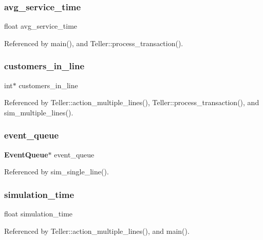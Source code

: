 \subsubsection{avg\+\_\+service\+\_\+time}
{\footnotesize\ttfamily float avg\+\_\+service\+\_\+time}



Referenced by main(), and Teller\+::process\+\_\+transaction().

\mbox{\label{teller_8cpp_abf7392d380d62115dbe6c7c4d74dab62}} 
\subsubsection{customers\+\_\+in\+\_\+line}
{\footnotesize\ttfamily int$\ast$ customers\+\_\+in\+\_\+line}



Referenced by Teller\+::action\+\_\+multiple\+\_\+lines(), Teller\+::process\+\_\+transaction(), and sim\+\_\+multiple\+\_\+lines().

\mbox{\label{teller_8cpp_aa744d577d29be27806283672a6ef5502}} 
\subsubsection{event\+\_\+queue}
{\footnotesize\ttfamily \textbf{ Event\+Queue}$\ast$ event\+\_\+queue}



Referenced by sim\+\_\+single\+\_\+line().

\mbox{\label{teller_8cpp_a68868698f39e24d72046de64a0adbc70}} 
\subsubsection{simulation\+\_\+time}
{\footnotesize\ttfamily float simulation\+\_\+time}



Referenced by Teller\+::action\+\_\+multiple\+\_\+lines(), and main().

\mbox{\label{teller_8cpp_abf47d44d813ba82d16ab2770fb3f66f4}} 
